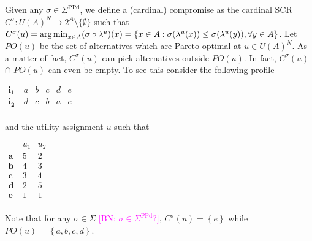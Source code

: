 \documentclass[version=3.21, pagesize, notitlepage, twoside=off, bibliography=totoc, DIV=calc, fontsize=12pt, a4paper]{scrartcl}
\newcommand{\commentBN}[1]{\textcolor{magenta}{\small$\big[$BN: #1$\big]$}}
\newcommand{\paretopt}{\mathit{PO}}
\newcommand{\SPPd}{\Sigma^\text{PPd}}
\begin{document}
Given any $\sigma \in \SPPd$, we define a (cardinal) compromise as the cardinal SCR $C^{\sigma }:U(A)^{N}\rightarrow 2^{A} \setminus \{\emptyset \}$ such that $C^{\sigma }(u) = \operatorname*{arg\,min}_{x \in A} (\sigma \circ \lambda^u)(x) = \left\{ x\in A:\sigma (\lambda ^{u}(x))\leq \sigma (\lambda ^{u}(y)), \forall y\in A\right\} $. Let $\paretopt(u)$ be the set of alternatives which are Pareto optimal at $u\in U(A)^{N}$. As a matter of fact, $C^{\sigma }(u)$ can pick alternatives outside $\paretopt(u)$. In fact, $C^{\sigma }(u)$ $\cap $ $\paretopt(u)$ can even be empty. To see this consider the following profile
\begin{center}
	$
	\begin{array}{cccccc}
	\mathbf{i_1} \ & a & b & c & d & e \\
	\mathbf{i_2} \ & d & c & b & a & e \\
	\end{array}
	$
\end{center}
and the utility assignment $u$ such that
\begin{center}
	$
	\begin{array}{ccc}
	& u_1 & u_2 \\
	\mathbf{a} \ & 5 & 2 \\
	\mathbf{b} \ & 4 & 3 \\
	\mathbf{c} \ & 3 & 4 \\
	\mathbf{d} \ & 2 & 5 \\
	\mathbf{e} \ & 1 & 1 \\
	\end{array}
	$
\end{center}
Note that for any $\sigma \in \Sigma $ \commentBN{$\sigma \in \SPPd $?}, $C^{\sigma }(u)=\left\{ e\right\} $ while $\paretopt(u)=\left\{ a, b, c, d\right\} $. 
\end{document}
